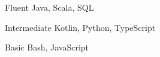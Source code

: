 
\begin{cvskills}

    \cvskill
    {Fluent}
    {Java, Scala, SQL}

    \cvskill
    {Intermediate}
    {Kotlin, Python, TypeScript}

    \cvskill
    {Basic}
    {Bash, JavaScript}

\end{cvskills}
